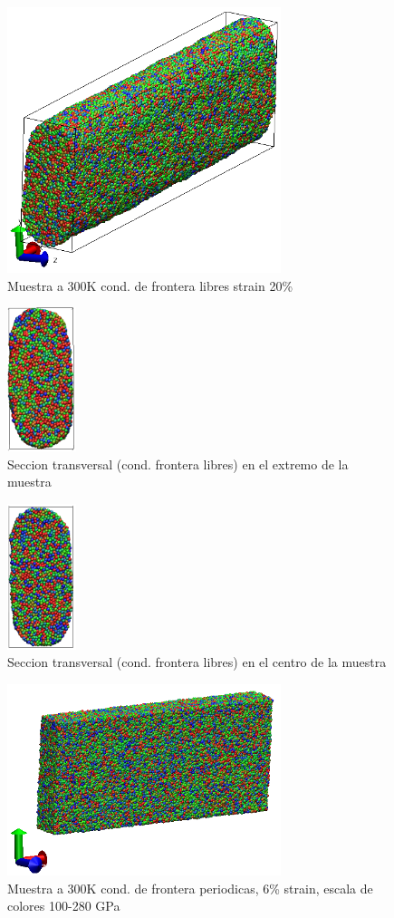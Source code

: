 \documentclass[10pt, oneside]{article} %
\begin{document}
\begin{figure}[H]
\centering
\includegraphics[width=8cm]{Figures/900libresTen.png}
\caption{Muestra a 300K cond. de frontera libres strain 20\%}
\end{figure}

\begin{figure}[H]
\centering
\includegraphics[width=2cm]{Figures/crossa.png}
\caption{Seccion transversal (cond. frontera libres) en el extremo de la muestra}
\end{figure}

\begin{figure}[H]
\centering
\includegraphics[width=2cm]{Figures/crossb.png}
\caption{Seccion transversal (cond. frontera libres) en el centro de la muestra}
\end{figure}

\begin{figure}[H]
\centering
\includegraphics[width=8cm]{Figures/All_300K_6pstrain_sacale100-280_Trac.png}
\caption{Muestra a 300K cond. de frontera periodicas, 6\% strain, escala de colores 100-280 GPa}
\end{figure}
\end{document}
